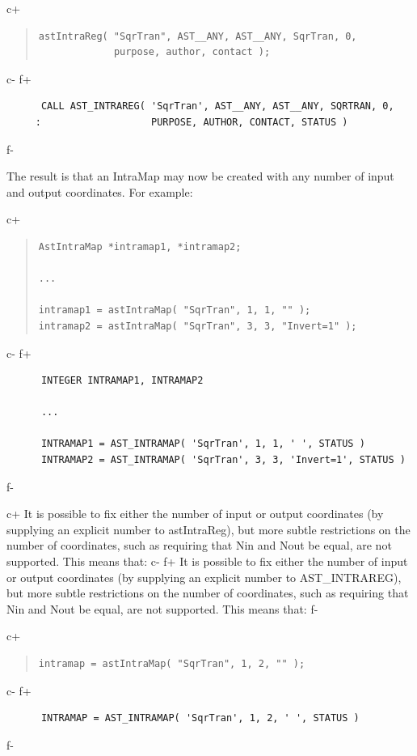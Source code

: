 \documentclass[twoside,11pt]{article}
\begin{document}
c+
\begin{quote}
\small
\begin{verbatim}
astIntraReg( "SqrTran", AST__ANY, AST__ANY, SqrTran, 0,
             purpose, author, contact );
\end{verbatim}
\normalsize
\end{quote}
c-
f+
\small
\begin{verbatim}
      CALL AST_INTRAREG( 'SqrTran', AST__ANY, AST__ANY, SQRTRAN, 0,
     :                   PURPOSE, AUTHOR, CONTACT, STATUS )
\end{verbatim}
\normalsize
f-

The result is that an IntraMap may now be created with any number of
input and output coordinates. For example:

c+
\begin{quote}
\small
\begin{verbatim}
AstIntraMap *intramap1, *intramap2;

...

intramap1 = astIntraMap( "SqrTran", 1, 1, "" );
intramap2 = astIntraMap( "SqrTran", 3, 3, "Invert=1" );
\end{verbatim}
\normalsize
\end{quote}
c-
f+
\small
\begin{verbatim}
      INTEGER INTRAMAP1, INTRAMAP2

      ...

      INTRAMAP1 = AST_INTRAMAP( 'SqrTran', 1, 1, ' ', STATUS )
      INTRAMAP2 = AST_INTRAMAP( 'SqrTran', 3, 3, 'Invert=1', STATUS )
\end{verbatim}
\normalsize
f-

c+
It is possible to fix either the number of input or output coordinates
(by supplying an explicit number to astIntraReg), but more subtle
restrictions on the number of coordinates, such as requiring that Nin
and Nout be equal, are not supported. This means that:
c-
f+
It is possible to fix either the number of input or output coordinates
(by supplying an explicit number to AST\_INTRAREG), but more subtle
restrictions on the number of coordinates, such as requiring that Nin
and Nout be equal, are not supported. This means that:
f-

c+
\begin{quote}
\small
\begin{verbatim}
intramap = astIntraMap( "SqrTran", 1, 2, "" );
\end{verbatim}
\normalsize
\end{quote}
c-
f+
\small
\begin{verbatim}
      INTRAMAP = AST_INTRAMAP( 'SqrTran', 1, 2, ' ', STATUS )
\end{verbatim}
\normalsize
f-
\end{document}
